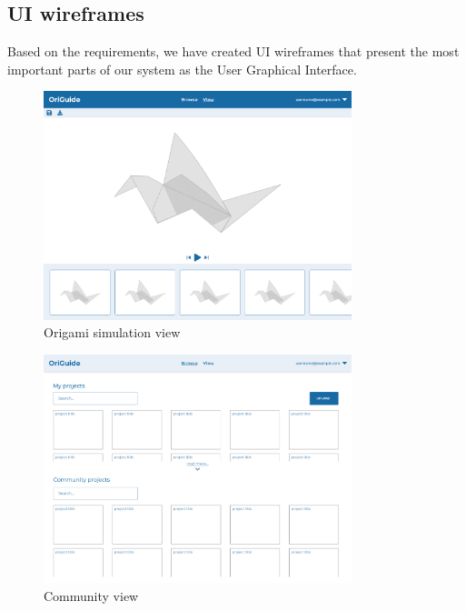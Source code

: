 \begin{enumerate}
\end{enumerate}

\subsection{UI wireframes}

Based on the requirements, we have created UI wireframes that
present the most important parts of our system as the User Graphical Interface.


\begin{figure}[H]
\caption{Origami simulation view}
  \centering
    \includegraphics[width=0.8\textwidth]{assets/simulator-wireframe.png}
\end{figure}

\begin{figure}[H]
\caption{Community view}
  \centering
    \includegraphics[width=0.8\textwidth]{assets/browser-wireframe.png}
\end{figure}
